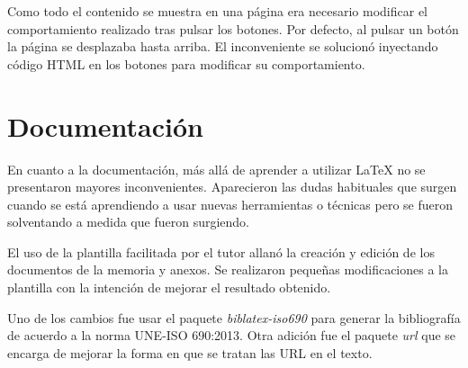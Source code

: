 Como todo el contenido se muestra en una página era necesario modificar el
comportamiento realizado tras pulsar los botones. Por defecto, al pulsar un
botón la página se desplazaba hasta arriba. El inconveniente se solucionó
inyectando código HTML en los botones para modificar su comportamiento.

\section{Documentación}{\label{sec:documentacion}}
En cuanto a la documentación, más allá de aprender a utilizar \LaTeX{} no se
presentaron mayores inconvenientes. Aparecieron las dudas habituales que surgen
cuando se está aprendiendo a usar nuevas herramientas o técnicas pero se fueron
solventando a medida que fueron surgiendo.

El uso de la plantilla facilitada por el tutor allanó la creación y edición de 
los documentos de la memoria y anexos. Se realizaron pequeñas modificaciones a
la plantilla con la intención de mejorar el resultado obtenido. 

Uno de los cambios fue usar el paquete \emph{biblatex-iso690} para generar la
bibliografía de acuerdo a la norma UNE-ISO 690:2013. Otra adición fue el
paquete \emph{url} que se encarga de mejorar la forma en que se tratan las URL
en el texto.
